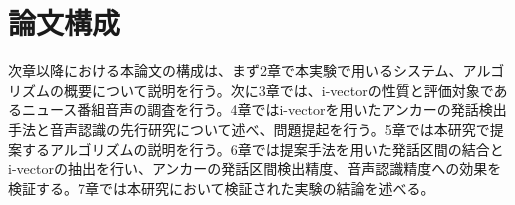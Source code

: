 \section{論文構成}
次章以降における本論文の構成は、まず2章で本実験で用いるシステム、アルゴリズムの概要について説明を行う。次に3章では、i-vectorの性質と評価対象であるニュース番組音声の調査を行う。4章ではi-vectorを用いたアンカーの発話検出手法と音声認識の先行研究について述べ、問題提起を行う。5章では本研究で提案するアルゴリズムの説明を行う。6章では提案手法を用いた発話区間の結合とi-vectorの抽出を行い、アンカーの発話区間検出精度、音声認識精度への効果を検証する。7章では本研究において検証された実験の結論を述べる。

